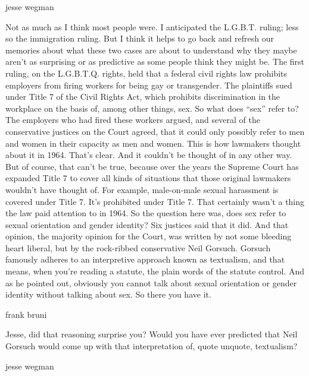 jesse wegman

Not as much as I think most people were. I anticipated the L.G.B.T.
ruling; less so the immigration ruling. But I think it helps to go back
and refresh our memories about what these two cases are about to
understand why they maybe aren't as surprising or as predictive as some
people think they might be. The first ruling, on the L.G.B.T.Q. rights,
held that a federal civil rights law prohibits employers from firing
workers for being gay or transgender. The plaintiffs sued under Title 7
of the Civil Rights Act, which prohibits discrimination in the workplace
on the basis of, among other things, sex. So what does ``sex'' refer to?
The employers who had fired these workers argued, and several of the
conservative justices on the Court agreed, that it could only possibly
refer to men and women in their capacity as men and women. This is how
lawmakers thought about it in 1964. That's clear. And it couldn't be
thought of in any other way. But of course, that can't be true, because
over the years the Supreme Court has expanded Title 7 to cover all kinds
of situations that those original lawmakers wouldn't have thought of.
For example, male-on-male sexual harassment is covered under Title 7.
It's prohibited under Title 7. That certainly wasn't a thing the law
paid attention to in 1964. So the question here was, does sex refer to
sexual orientation and gender identity? Six justices said that it did.
And that opinion, the majority opinion for the Court, was written by not
some bleeding heart liberal, but by the rock-ribbed conservative Neil
Gorsuch. Gorsuch famously adheres to an interpretive approach known as
textualism, and that means, when you're reading a statute, the plain
words of the statute control. And as he pointed out, obviously you
cannot talk about sexual orientation or gender identity without talking
about sex. So there you have it.

frank bruni

Jesse, did that reasoning surprise you? Would you have ever predicted
that Neil Gorsuch would come up with that interpretation of, quote
unquote, textualism?

jesse wegman

